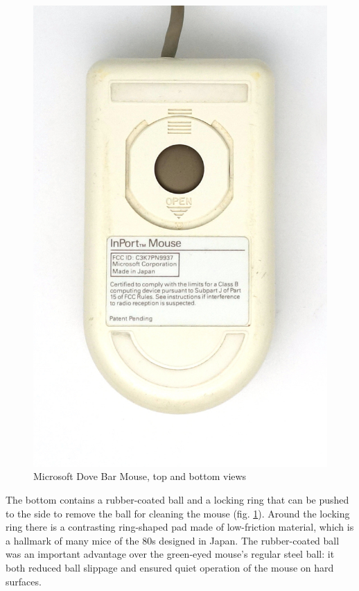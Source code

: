 \documentclass[11pt, a4paper]{article}
\begin{document}
\begin{figure}[h]
    \includegraphics[scale=0.6]{1987_microsoft_dove_bar_mouse/bottom_30.jpg}
    \caption{Microsoft Dove Bar Mouse, top and bottom views}
    \label{fig:MicrosoftDoveBarTopAndBottom}
\end{figure}

The bottom contains a rubber-coated ball and a locking ring that can be pushed to the side to remove the ball for cleaning the mouse (fig. \ref{fig:MicrosoftDoveBarTopAndBottom}). Around the locking ring there is a contrasting ring-shaped pad made of low-friction material, which is a hallmark of many mice of the 80s designed in Japan. The rubber-coated ball was an important advantage over the green-eyed mouse's regular steel ball: it both reduced ball slippage and ensured quiet operation of the mouse on hard surfaces.
\end{document}
